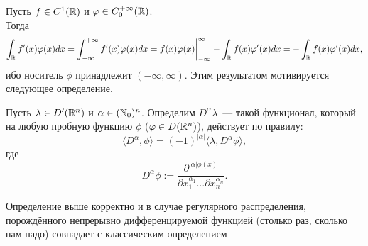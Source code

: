 \begin{note}
    Пусть $f \in C^1(\mathbb{R})$ и $\varphi \in C^{+\infty}_0(\mathbb{R})$. \\
    Тогда
    \[
        \int_{\mathbb{R}} f'(x)\varphi(x) dx = \int_{-\infty}^{+\infty} f'(x) \varphi(x) dx = f(x)\varphi(x) \bigg|^{\infty}_{-\infty} - \int_{\mathbb{R}}f(x) \varphi'(x) dx = -\int_{\mathbb{R}}f(x) \varphi'(x) dx,
    \]
    ибо носитель $\phi$ принадлежит $(-\infty, \infty)$.
    Этим результатом мотивируется следующее определение.
\end{note}
\begin{definition}
    Пусть $\lambda \in D'(\mathbb{R}^n)$ и $\alpha \in (\mathbb{N}_0)^n$.
    Определим $D^\alpha \lambda$~--- такой функционал, который на любую пробную  функцию $\phi$ ($\varphi \in D(\mathbb{R}^n)$), действует по правилу:
    \[
        \langle D^{\alpha}, \phi \rangle = (-1)^{|\alpha|} \langle \lambda, D^{\alpha}\phi \rangle,
    \]
    где
    \[
        D^{\alpha}\phi:= \dfrac{\partial^{|\alpha|\phi(x)}}{\partial x_1^{\alpha_1}\dots\partial x_n^{\alpha_n}}.
    \]
\end{definition}
\begin{theorem}
    Определение выше корректно и в случае регулярного распределения, порождённого непрерывно дифференцируемой функцией (столько раз, сколько нам надо) совпадает с классическим определением
\end{theorem}
